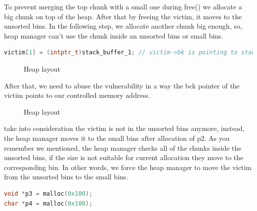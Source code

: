 \documentclass{masterthesis}
\newcommand*\ub{unsorted bins}
\newcommand*\sbs{small bins}
\begin{document}
To prevent merging the top chunk with a small one during free() we allocate a big chunk on top of the heap. After that by freeing the victim, it moves to the \ub{}. In the following step, we allocate another chunk big enough, so, heap manager can't use the chunk inside an \ub{} or \sbs{}.
\begin{lstlisting}[language=c,frame=tlrb]
victim[1] = (intptr_t)stack_buffer_1; // victim->bk is pointing to stack
\end{lstlisting}
  
\begin{figure}[h!]
  \caption{Heap layout}
\end{figure}
After that, we need to abuse the vulnerability in a way the bck pointer of the victim points to our controlled memory address. 
\begin{figure}[h!]
  \caption{Heap layout}
\end{figure}
take into consideration the victim is not in the \ub{} anymore, instead, the heap manager moves it to the \sbs{} after allocation of p2. As you remember we mentioned, the heap manager checks all of the chunks inside the \ub{}, if the size is not suitable for current allocation they move to the corresponding bin. In other words, we force the heap manager to move the victim from the \ub{} to the \sbs{}.

\begin{lstlisting}[language=c,frame=tlrb]
void *p3 = malloc(0x100);
char *p4 = malloc(0x100);
\end{lstlisting}
\end{document}
